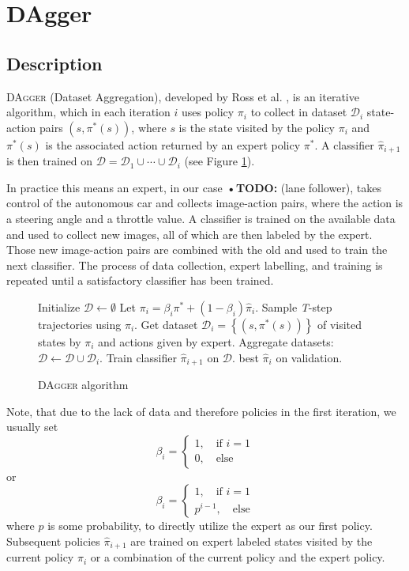 \documentclass[conference]{IEEEtran}
\begin{document}
\section{DAgger}

\subsection{Description}

DA\textsc{gger} (Dataset Aggregation), developed by Ross et al. \cite{Ross2011}, is an iterative algorithm, which in each iteration \( i \) uses policy \( \pi_i \) to collect in dataset \( \mathcal{D}_i \) state-action pairs \( (s,\pi^*(s)) \), where \( s \) is the state visited by the policy \( \pi_i \) and \( \pi^*(s) \) is the associated action returned by an expert policy \( \pi^* \). A classifier \( \hat{ \pi}_{i+1} \) is then trained on \( \mathcal{D} = \mathcal{D}_1 \cup \dotsm \cup \mathcal{D}_i \) (see Figure \ref{fig:dagger}).

In practice this means an expert, in our case \textbf{•TODO:} (lane follower), takes control of the autonomous car and collects image-action pairs, where the action is a steering angle and a throttle value. A classifier is trained on the available data and used to collect new images, all of which are then labeled by the expert. Those new image-action pairs are combined with the old and used to train the next classifier. The process of data collection, expert labelling, and training is repeated until a satisfactory classifier has been trained.

\begin{figure}[h]
\begin{algorithmic}[1]
\STATE Initialize \(\mathcal{D}\gets \emptyset\)
\STATE Let \( \pi_i = \beta_i \pi^* + \left( 1- \beta_i\right)\hat{ \pi}_i \).
\STATE Sample \textit{T}-step trajectories using \( \pi_i \).
\STATE Get dataset \( \mathcal{D}_i = \left\{ \left( s, \pi^*(s)\right)\right\} \) of visited states by \( \pi_i \) and actions given by expert.
\STATE Aggregate datasets: \( \mathcal{D}\gets \mathcal{D} \cup \mathcal{D}_i \).
\STATE Train classifier \( \hat{ \pi}_{i+1} \) on \( \mathcal{D} \).
\ENDFOR
\RETURN best \( \hat{ \pi}_i \) on validation.
\end{algorithmic}
\caption{DA\textsc{gger} algorithm}
\label{fig:dagger}
\end{figure}

Note, that due to the lack of data and therefore policies in the first iteration, we usually set
\[
\beta_i = \begin{cases}
1,\quad\text{if }i=1\\
0,\quad\text{else}
\end{cases}
\]
or
\[
\beta_i = \begin{cases}
1,\quad\text{if }i=1\\
p^{i-1},\quad\text{else}
\end{cases}
\]
where \( p \) is some probability, to directly utilize the expert as our first policy. Subsequent policies \( \hat{ \pi}_{i+1} \) are trained on expert labeled states visited by the current policy \( \pi_i \) or a combination of the current policy and the expert policy.
\end{document}
